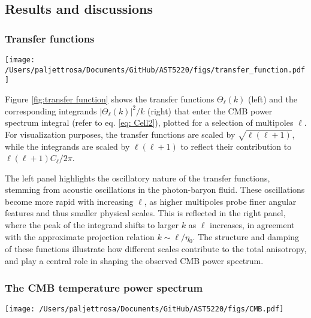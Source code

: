 \documentclass{aa}
\numberwithin{equation}{section}
\numberwithin{table}{section}
\numberwithin{figure}{section}
\begin{document}
\subsection{Results and discussions}\label{subsec: IV results}

\subsubsection{Transfer functions}
\begin{figure*}
  \centering
  \texttt{[image: /Users/paljettrosa/Documents/GitHub/AST5220/figs/transfer\_function.pdf]}
  \caption{The transfer functions $\Theta_\ell(k)$ (left) and the integrands $|\Theta_\ell(k)|^2/k$ (right) for selected multipoles $\ell$. The transfer function encodes how primordial perturbations in Fourier space evolve and project onto angular multipoles at the present, while the integrand determines the contribution of each mode $k$ to the power spectrum $C_\ell$.}\label{fig:transfer function}
\end{figure*}

Figure \ref{fig:transfer function} shows the transfer functions $\Theta_\ell(k)$ (left) and the corresponding integrands $|\Theta_\ell(k)|^2/k$ (right) that enter the CMB power spectrum integral (refer to eq. \eqref{eq: Cell2}), plotted for a selection of multipoles $\ell$. For visualization purposes, the transfer functions are scaled by $\sqrt{\ell(\ell+1)}$, while the integrands are scaled by $\ell(\ell+1)$ to reflect their contribution to $\ell(\ell+1)C_\ell/2\pi$.

The left panel highlights the oscillatory nature of the transfer functions, stemming from acoustic oscillations in the photon-baryon fluid. These oscillations become more rapid with increasing $\ell$, as higher multipoles probe finer angular features and thus smaller physical scales. This is reflected in the right panel, where the peak of the integrand shifts to larger $k$ as $\ell$ increases, in agreement with the approximate projection relation $k \sim \ell/\eta_0$. The structure and damping of these functions illustrate how different scales contribute to the total anisotropy, and play a central role in shaping the observed CMB power spectrum.


\subsubsection{The CMB temperature power spectrum}
\begin{figure*}
  \centering
  \texttt{[image: /Users/paljettrosa/Documents/GitHub/AST5220/figs/CMB.pdf]}
  \caption{The CMB temperature power spectrum $C_\ell^\text{TT}$ computed with Helium, reionization, polarization, and neutrinos included (black), and without these components (pink). The shaded region denotes the cosmic variance of the first of these, computed from eq. \eqref{eq: variance}. Low-$\ell$ and binned high-$\ell$ Planck data are plotted in orange and purple, respectively. The inset shows a zoom of the high-$\ell$ region.}
  \label{fig:CMB}
\end{figure*}
\end{document}
